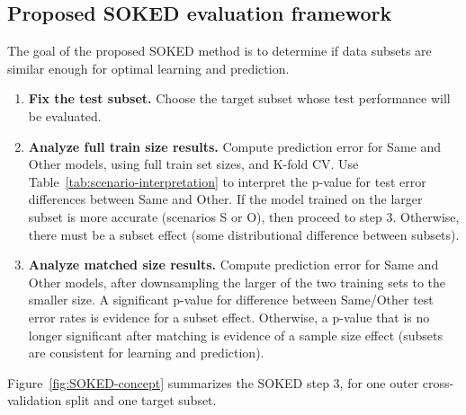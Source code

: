 \documentclass{article}
\begin{document}
\subsection{Proposed SOKED evaluation framework}
\label{sec:workflow}
The goal of the proposed SOKED method is to determine if data subsets are similar enough for optimal learning and prediction.
\begin{enumerate}
    \item \textbf{Fix the test subset.} Choose the target subset whose test performance will be evaluated.
    \item \textbf{Analyze full train size results.}
    Compute prediction error for Same and Other models, using full train set sizes, and K-fold CV.
    Use Table~\ref{tab:scenario-interpretation} to interpret the p-value for test error differences between Same and Other.
    If the model trained on the larger subset is more accurate (scenarios S or O), then proceed to step 3.
    Otherwise, there must be a subset effect (some distributional difference between subsets).
    \item \textbf{Analyze matched size results.}
    Compute prediction error for Same and Other models, after downsampling the larger of the two training sets to the smaller size.
    A significant p-value for difference between Same/Other test error rates is evidence for a subset effect.
    Otherwise, a p-value that is no longer significant after matching is evidence of a sample size effect (subsets are consistent for learning and prediction).
\end{enumerate}
Figure~\ref{fig:SOKED-concept} summarizes the SOKED step 3, for one outer cross-validation split and one target subset.
\end{document}
